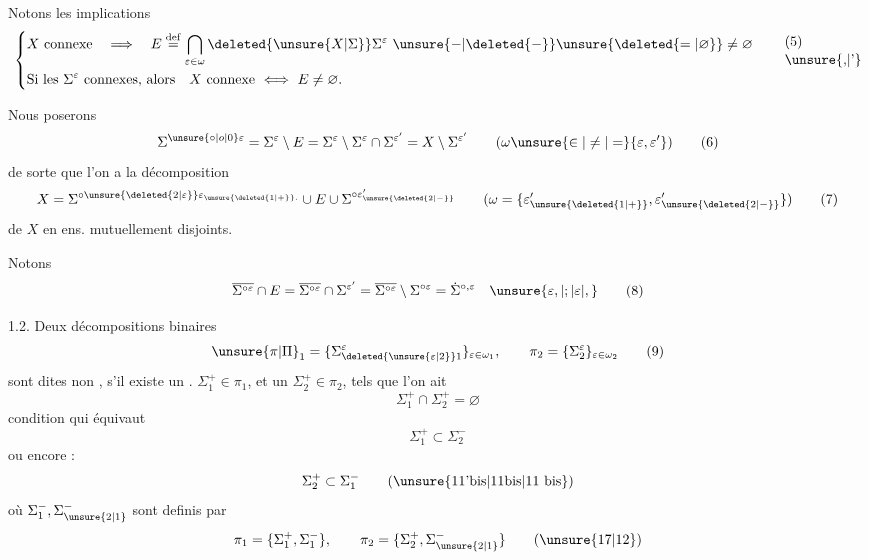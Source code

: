 \begingroup
\makeatletter\tagsleft@true\makeatother
Notons les implications
\[
\left\{\begin{aligned}
&X\ \text{connexe}\quad\Longrightarrow\quad E\overset{\mathrm{def}}{=}\bigcap_{\varepsilon\in\omega}\deleted{\unsure{X|\Sigma}}\Sigma^\varepsilon\ \unsure{-|\deleted{-}}\unsure{\deleted{=|\varnothing}}\ne\varnothing\\
&\text{Si les }\Sigma^\varepsilon\ \text{connexes, alors}\quad X\ \text{connexe}\ \Longleftrightarrow\ E\ne\varnothing.
\end{aligned}\right.\tag*{\shortstack[l]{(5)\\\unsure{,|'}}}
\]

Nous poserons
\[
\Sigma^{\unsure{\circ|o|0}\varepsilon}=\Sigma^\varepsilon\setminus E=\Sigma^\varepsilon\setminus\Sigma^\varepsilon\cap\Sigma^{\varepsilon'}=X\setminus\Sigma^{\varepsilon'}\qquad(\omega\unsure{\in|\ne|=}\{\varepsilon,\varepsilon'\})\tag*{(6)}
\]
de sorte que l'on a la décomposition
\[
X=\Sigma^{\circ\unsure{\deleted{2|\varepsilon}}\varepsilon_{\unsure{\deleted{1|+}}.}}\cup E\cup\Sigma^{\circ\varepsilon'_{\unsure{\deleted{2|-}}}}\qquad(\omega=\{\varepsilon'_{\unsure{\deleted{1|+}}},\varepsilon'_{\unsure{\deleted{2|-}}}\})\tag*{(7)}
\]
de $X$ en  ens. mutuellement disjoints.

Notons
\[
\overline{\Sigma^{\circ\varepsilon}}\cap E=\overline{\Sigma^{\circ\varepsilon}}\cap\Sigma^{\varepsilon'}=\overline{\Sigma^{\circ\varepsilon}}\setminus\Sigma^{\circ\varepsilon}=\dot{\Sigma}^{\circ,\varepsilon}\quad\unsure{\varepsilon,|;|\varepsilon|,}\tag*{(8)}
\]

\par
{}

1.2. Deux décompositions binaires
\[
\unsure{\pi|\Pi}_1=\{\Sigma_{\deleted{\unsure{\varepsilon|2}}1}^\varepsilon\}_{\varepsilon\in\omega_1},\qquad\pi_2=\{\Sigma_2^\varepsilon\}_{\varepsilon\in\omega_2}\tag*{(9)}
\]
sont dites non \uline{},  s'il existe un . $\Sigma_1^+\in\pi_1$, et un $\Sigma_2^+\in\pi_2$, tels que l'on ait
\[
\Sigma_1^+\cap\Sigma_2^+=\varnothing\tag*{(10)}
\]
condition qui équivaut 
\[
\Sigma_1^+\subset\Sigma_2^-\tag*{(11)}
\]
ou encore :
\[
\Sigma_2^+\subset\Sigma_1^-\tag*{(\unsure{11'bis|11bis|11 bis})}
\]
où $\Sigma_1^-,\Sigma_{\unsure{2|1}}^-$ sont definis par
\[
\pi_1=\{\Sigma_1^+,\Sigma_1^-\},\qquad\pi_2=\{\Sigma_2^+,\Sigma_{\unsure{2|1}}^-\}\tag*{(\unsure{17|12})}
\]
\endgroup
